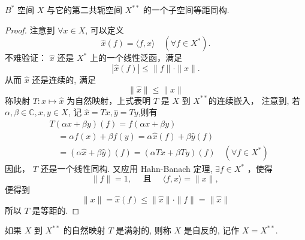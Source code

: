 \documentclass[lang=cn,newtx,10pt,scheme=chinese,thmcnt=chapter]{elegantbook}
\begin{document}
\begin{theorem}
$B^*$ 空间 $X$ 与它的第二共轭空间 $X ^{* *}$ 的一个子空间等距同构.
\end{theorem}
\begin{proof}
注意到 $\forall x \in X$, 可以定义
\begin{equation*}
\hat{x}(f)=\langle f, x\rangle \quad\left(\forall f \in X ^*\right) .
\end{equation*}
不难验证： $\hat{x}$ 还是 $X ^*$ 上的一个线性泛函，满足
\begin{equation*}
|\hat{x}(f)| \leqslant\|f\| \cdot\|x\| .
\end{equation*}
从而 $\hat{x}$ 还是连续的, 满足
\begin{equation*}
\|\hat{x}\| \leqslant\|x\|
\end{equation*}
称映射 $T: x \mapsto \hat{x}$ 为自然映射，上式表明 $T$ 是 $X$ 到 $X ^{* *}$的连续嵌入， 注意到, 若 $\alpha, \beta \in \mathbb{C} , x, y \in X$, 记 $\hat{x}=T x, \hat{y}=T y$,则有
\begin{equation*}
\begin{aligned}
& T(\alpha x+\beta y)(f)=f(\alpha x+\beta y) \\
& \quad=\alpha f(x)+\beta f(y)=\alpha \hat{x}(f)+\beta \hat{y}(f) \\
& \quad=(\alpha\hat{x}+\beta \hat{y})(f)=(\alpha T x+\beta T y)(f) \quad\left(\forall f \in X ^*\right)
\end{aligned}
\end{equation*}
因此， $T$ 还是一个线性同构. 又应用 Hahn-Banach 定理, $\exists f \in X ^*$ ，使得
\begin{equation*}
\|f\|=1, \quad \text { 且 } \quad\langle f, x\rangle=\|x\| \text {, }
\end{equation*}
便得到
\begin{equation*}
\|x\|=\hat{x}(f) \leqslant\|\hat{x}\| \cdot\|f\|=\|\hat{x}\|
\end{equation*}
所以 $T$ 是等距的. 
\end{proof}

\begin{definition}
如果 $X$ 到 $X ^{* *}$ 的自然映射 $T$ 是满射的, 则称 $X$ 是自反的, 记作 $X = X ^{* *}$.
\end{definition}
\end{document}
